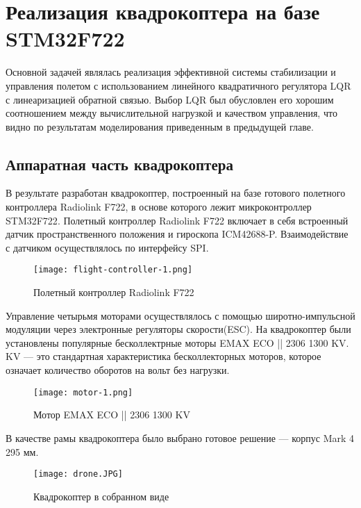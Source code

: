\chapter{Реализация квадрокоптера на базе STM32F722}

Основной задачей являлась 
реализация эффективной системы стабилизации и управления 
полетом с использованием линейного квадратичного регулятора LQR 
с линеаризацией обратной связью. Выбор 
LQR был обусловлен его хорошим соотношением между вычислительной 
нагрузкой и качеством управления, что видно 
по результатам моделирования приведенным в предыдущей главе.

\section{Аппаратная часть квадрокоптера}

В результате разработан квадрокоптер, построенный на базе готового 
полетного контроллера Radiolink F722, в основе которого лежит 
микроконтроллер STM32F722\cite{RadiolinkF722}\cite{STM32F722}. 
Полетный контроллер Radiolink F722 включает в себя встроенный датчик пространственного положения 
и гироскопа ICM42688-P. Взаимодействие с датчиком осуществлялось по интерфейсу SPI\cite{ICM42688P}.


\begin{figure}[ht]
    \centering
    \texttt{[image: flight-controller-1.png]}
    \caption{Полетный контроллер Radiolink F722}
    \label{}
\end{figure}

Управление четырьмя моторами осуществлялось с помощью широтно-импульсной модуляции
через электронные регуляторы скорости(ESC). На квадрокоптер были установлены популярные бесколлектрные моторы
EMAX ECO || 2306 1300 KV\cite{EmaxECO1300KV}. KV --- это стандартная характеристика бесколлекторных моторов, которое означает
количество оборотов на вольт без нагрузки.

\begin{figure}[ht]
    \centering
    \texttt{[image: motor-1.png]}
    \caption{Мотор EMAX ECO || 2306 1300 KV}
    \label{}
\end{figure}


В качестве рамы квадрокоптера было выбрано готовое решение --- корпус Mark 4 295 мм.

\begin{figure}[ht]
	\centering
	\texttt{[image: drone.JPG]}
	\caption{Квадрокоптер в собранном виде}
	\label{}
\end{figure}


